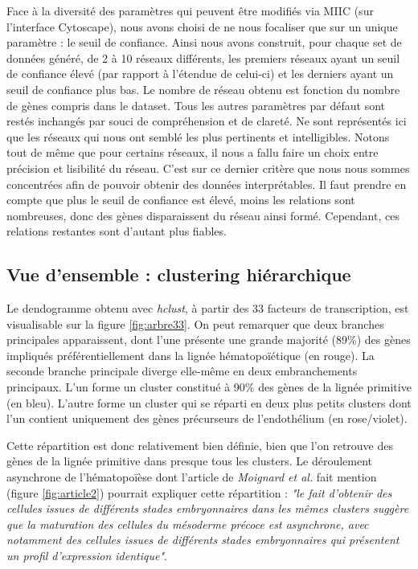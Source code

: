 \documentclass[fleqn,11pt]{SelfArx} %
\begin{document}
 
Face à la diversité des paramètres qui peuvent être modifiés via MIIC (sur l'interface Cytoscape), nous avons choisi de ne nous focaliser que sur un unique paramètre : le seuil de confiance. Ainsi nous avons construit, pour chaque set de données généré, de 2 à 10 réseaux différents, les premiers réseaux ayant un seuil de confiance élevé (par rapport à l'étendue de celui-ci) et les derniers ayant un seuil de confiance plus bas. Le nombre de réseau obtenu est fonction du nombre de gènes compris dans le dataset. Tous les autres paramètres par défaut sont restés inchangés par souci de compréhension et de clareté. Ne sont représentés ici que les réseaux qui nous ont semblé les plus pertinents et intelligibles. Notons tout de même que pour certains réseaux, il nous a fallu faire un choix entre précision et lisibilité du réseau. C'est sur ce dernier critère que nous nous sommes concentrées afin de pouvoir obtenir des données interprétables. Il faut prendre en compte que plus le seuil de confiance est élevé, moins les relations sont nombreuses, donc des gènes disparaissent du réseau ainsi formé. Cependant, ces relations restantes sont d'autant plus fiables. 

\subsection{Vue d'ensemble : clustering hiérarchique}
Le dendogramme obtenu avec \textit{hclust}, à partir des 33 facteurs de transcription, est visualisable sur la figure \ref{fig:arbre33}. On peut remarquer que deux branches principales apparaissent, dont l'une présente une grande majorité (89\%) des gènes impliqués préférentiellement dans la lignée hématopoïétique (en rouge). La seconde branche principale diverge elle-même en deux embranchements principaux. L'un forme un cluster constitué à 90\% des gènes de la lignée primitive (en bleu). L'autre forme un cluster qui se réparti en deux plus petits clusters dont l'un contient uniquement des gènes précurseurs de l'endothélium (en rose/violet). 

\par Cette répartition est donc relativement bien définie, bien que l'on retrouve des gènes de la lignée primitive dans presque tous les clusters. Le déroulement asynchrone de l'hématopoïèse dont l'article de \textit{Moignard et al.} fait mention (figure \ref{fig:article2}) pourrait expliquer cette répartition : \textit{"le fait d'obtenir des cellules issues de différents stades embryonnaires dans les mêmes clusters suggère que la maturation des cellules du mésoderme précoce est asynchrone, avec notamment des cellules issues de différents stades embryonnaires qui présentent un profil d'expression identique"}.
\end{document}
